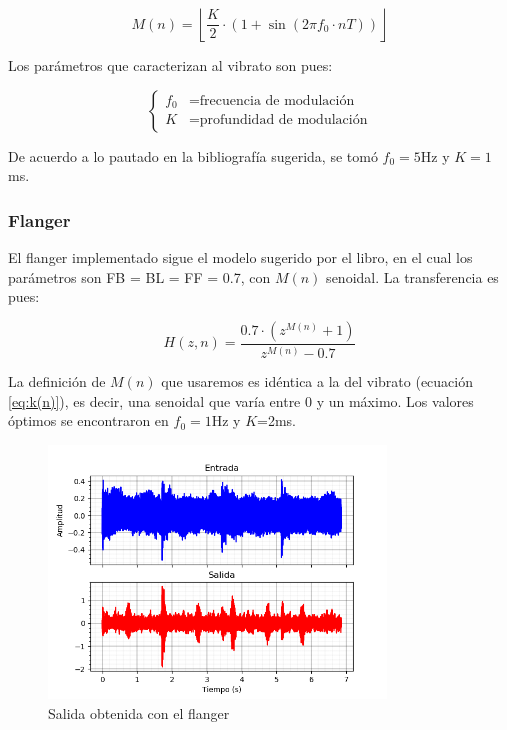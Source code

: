 \documentclass[assd_tp2_main.tex]{subfiles}
\begin{document}
\begin{equation}
	M(n) = \left \lfloor \frac{K}{2} \cdot 
		\left( 1 + \sin{\left(2\pi f_0 \cdot nT\right)} \right) \right \rfloor
		\label{eq:k(n)}
\end{equation}

Los par\'ametros que caracterizan al vibrato son pues:

\begin{equation}
	\left\{
	\begin{aligned}
		f_0	&= \text{frecuencia de modulaci\'on} \\
		K   	&= \text{profundidad de modulaci\'on}
	\end{aligned}	
	\right.
\end{equation}

De acuerdo a lo pautado en la bibliograf\'ia sugerida, se tom\'o $f_0=5$Hz y $K=1$ms.



\subsubsection{Flanger}

El flanger implementado sigue el modelo sugerido por el libro, en el cual los par\'ametros son FB = BL = FF = 0.7, con $M(n)$ senoidal. La transferencia es pues:

\begin{equation}
	H(z, n) = \frac{ 0.7  \cdot \left(z^{M(n)} +  1\right) }{z^{M(n)} - 0.7}
	\label{eq:tz-combuniv}
\end{equation}

La definici\'on de $M(n)$ que usaremos es id\'entica a la del vibrato (ecuaci\'on \ref{eq:k(n)}), es decir, una senoidal que var\'ia entre 0 y un m\'aximo. Los valores \'optimos se encontraron en $f_0 = 1$Hz y $K$=2ms.

\begin{figure}[htb]	
	\centering
	\includegraphics[width=0.8\textwidth]
	{graficos/EJ8/rochi/flanger.png}
	\caption{Salida obtenida con el flanger}
	\label{fig:flanger}
\end{figure}
\end{document}
